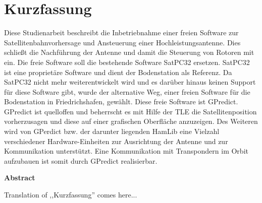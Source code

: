 
\chapter*{Kurzfassung}
Diese Studienarbeit beschreibt die Inbetriebnahme einer freien Software zur Satellitenbahnvorhersage und Ansteuerung einer Hochleistungsantenne. 
Dies schließt die Nachführung der Antenne und damit die Steuerung von Rotoren mit ein. Die freie Software soll die bestehende Software 
SatPC32 ersetzen. SatPC32 ist eine proprietäre Software und dient der Bodenstation als Referenz. Da SatPC32 nicht mehr weiterentwickelt wird 
und es darüber hinaus keinen Support für diese Software gibt, wurde der alternative Weg, einer freien Software für die Bodenstation in 
Friedrichshafen, gewählt. Diese freie Software ist GPredict. GPredict ist quelloffen und beherrscht es mit Hilfe der \ac{TLE} die Satellitenposition 
vorherzusagen und diese auf einer grafischen Oberfläche anzuzeigen. Des Weiteren wird von GPerdict bzw. der darunter liegenden HamLib eine Vielzahl 
verschiedener Hardware-Einheiten zur Ausrichtung der Antenne und zur Kommunikation unterstützt. Eine Kommunikation mit Transpondern im Orbit 
aufzubauen ist somit durch GPredict realisierbar.
 
\vspace{3em}
\begin{Huge}
	\textbf{Abstract}
\end{Huge}
\vspace{1.5em}

Translation of ,,Kurzfassung'' comes here...

\clearpage
